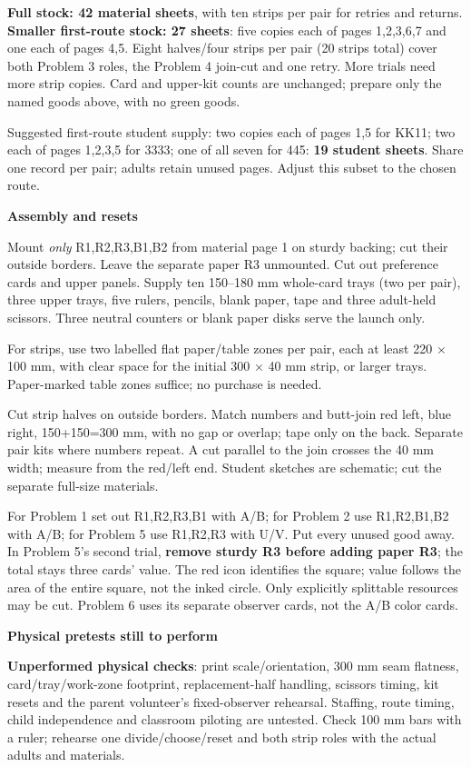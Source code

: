 \documentclass[11pt]{article}
\newcommand{\subhead}[1]{\par\vspace{1mm}\textbf{#1}\par}
\begin{document}
\textbf{Full stock: 42 material sheets}, with ten strips per pair for retries and returns. \textbf{Smaller first-route stock: 27 sheets}: five copies each of pages 1,2,3,6,7 and one each of pages 4,5. Eight halves/four strips per pair (20 strips total) cover both Problem 3 roles, the Problem 4 join-cut and one retry. More trials need more strip copies. Card and upper-kit counts are unchanged; prepare only the named goods above, with no green goods.

Suggested first-route student supply: two copies each of pages 1,5 for KK11; two each of pages 1,2,3,5 for 3333; one of all seven for 445: \textbf{19 student sheets}. Share one record per pair; adults retain unused pages. Adjust this subset to the chosen route.

\subhead{Assembly and resets}
Mount \emph{only} R1,R2,R3,B1,B2 from material page 1 on sturdy backing; cut their outside borders. Leave the separate paper R3 unmounted. Cut out preference cards and upper panels. Supply ten 150--180 mm whole-card trays (two per pair), three upper trays, five rulers, pencils, blank paper, tape and three adult-held scissors. Three neutral counters or blank paper disks serve the launch only.

For strips, use two labelled flat paper/table zones per pair, each at least 220 $\times$ 100 mm, with clear space for the initial 300 $\times$ 40 mm strip, or larger trays. Paper-marked table zones suffice; no purchase is needed.

Cut strip halves on outside borders. Match numbers and butt-join red left, blue right, 150+150=300 mm, with no gap or overlap; tape only on the back. Separate pair kits where numbers repeat. A cut parallel to the join crosses the 40 mm width; measure from the red/left end. Student sketches are schematic; cut the separate full-size materials.

For Problem 1 set out R1,R2,R3,B1 with A/B; for Problem 2 use R1,R2,B1,B2 with A/B; for Problem 5 use R1,R2,R3 with U/V. Put every unused good away. In Problem 5's second trial, \textbf{remove sturdy R3 before adding paper R3}; the total stays three cards' value. The red icon identifies the square; value follows the area of the entire square, not the inked circle. Only explicitly splittable resources may be cut. Problem 6 uses its separate observer cards, not the A/B color cards.

\subhead{Physical pretests still to perform}
\textbf{Unperformed physical checks}: print scale/orientation, 300 mm seam flatness, card/tray/work-zone footprint, replacement-half handling, scissors timing, kit resets and the parent volunteer's fixed-observer rehearsal. Staffing, route timing, child independence and classroom piloting are untested. Check 100 mm bars with a ruler; rehearse one divide/choose/reset and both strip roles with the actual adults and materials.
\end{document}
